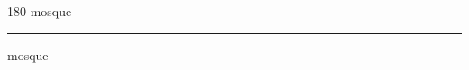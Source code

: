 
\begin{frame}
\begin{center}
\begin{turn}{180}
{\fontsize{2.5cm}{1em}\selectfont mosque}
\end{turn}
\vspace{1em}\par  
\hrule
\vspace{1em}\par  
{\fontsize{2.5cm}{1em}\selectfont mosque}
\end{center}
\end{frame}
